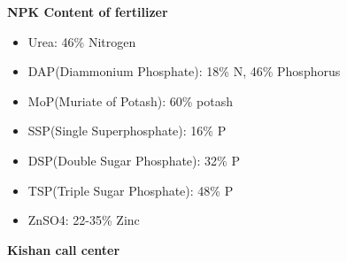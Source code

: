 \documentclass[
  openany]{book}
\providecommand{\tightlist}{%
  \setlength{\itemsep}{0pt}\setlength{\parskip}{0pt}}
\begin{document}
\textbf{NPK Content of fertilizer}

\begin{itemize}
\tightlist
\item
  Urea: 46\% Nitrogen
\item
  DAP(Diammonium Phosphate): 18\% N, 46\% Phosphorus
\item
  MoP(Muriate of Potash): 60\% potash
\item
  SSP(Single Superphosphate): 16\% P
\item
  DSP(Double Sugar Phosphate): 32\% P
\item
  TSP(Triple Sugar Phosphate): 48\% P
\item
  ZnSO4: 22-35\% Zinc
\end{itemize}

\textbf{Kishan call center}
\end{document}
